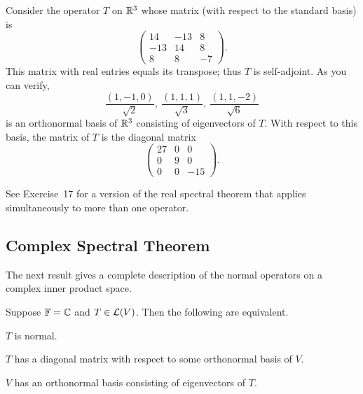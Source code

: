 \begin{example}%
\label{ax:7.30}
Consider the operator $T$ on $\mathbb{R}^3$ whose matrix (with respect to the standard
basis) is
\[ \begin{pmatrix} 14 & -13 & 8\\ -13 & 14 & 8\\ 8 & 8 & -7 \end{pmatrix}. \]
This matrix with real entries equals its transpose; thus $T$ is self-adjoint.
As you can verify,
\[ \frac{(1,-1,0)}{\sqrt2},\ \frac{(1,1,1)}{\sqrt3},\ \frac{(1,1,-2)}{\sqrt6} \]
is an orthonormal basis of $\mathbb{R}^3$ consisting of eigenvectors of $T$. With
respect to this basis, the matrix of $T$ is the diagonal matrix
\[ \begin{pmatrix} 27 & 0 & 0\\ 0 & 9 & 0\\ 0 & 0 & -15 \end{pmatrix}. \]
\end{example}

See Exercise~17 for a version of the real spectral theorem that applies
simultaneously to more than one operator.

\subsection{Complex Spectral Theorem}

The next result gives a complete description of the normal operators on a
complex inner product space.

\begin{result}\label{ax:7.31}
Suppose $\mathbb{F}=\mathbb{C}$ and $T\in\mathcal{L}(V)$. Then the following are equivalent.
\begin{parts}
\item $T$ is normal.
\item $T$ has a diagonal matrix with respect to some orthonormal basis of $V$.
\item $V$ has an orthonormal basis consisting of eigenvectors of $T$.
\end{parts}
\end{result}

